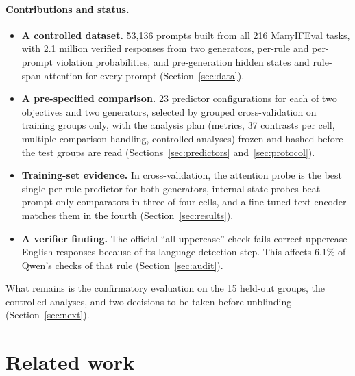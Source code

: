 \documentclass[10pt]{article}
\begin{document}
\paragraph{Contributions and status.}
\begin{itemize}
\item \textbf{A controlled dataset.} 53,136 prompts built from all 216 ManyIFEval tasks, with 2.1 million verified
responses from two generators, per-rule and per-prompt violation probabilities, and pre-generation hidden states and
rule-span attention for every prompt (Section~\ref{sec:data}).
\item \textbf{A pre-specified comparison.} 23 predictor configurations for each of two objectives and two generators,
selected by grouped cross-validation on training groups only, with the analysis plan (metrics, 37 contrasts per cell,
multiple-comparison handling, controlled analyses) frozen and hashed before the test groups are read
(Sections~\ref{sec:predictors} and~\ref{sec:protocol}).
\item \textbf{Training-set evidence.} In cross-validation, the attention probe is the best single per-rule predictor
for both generators, internal-state probes beat prompt-only comparators in three of four cells, and a fine-tuned text
encoder matches them in the fourth (Section~\ref{sec:results}).
\item \textbf{A verifier finding.} The official ``all uppercase'' check fails correct uppercase English responses
because of its language-detection step. This affects 6.1\% of Qwen's checks of that rule (Section~\ref{sec:audit}).
\end{itemize}
What remains is the confirmatory evaluation on the 15 held-out groups, the controlled analyses, and two decisions to be
taken before unblinding (Section~\ref{sec:next}).

\section{Related work}
\end{document}
